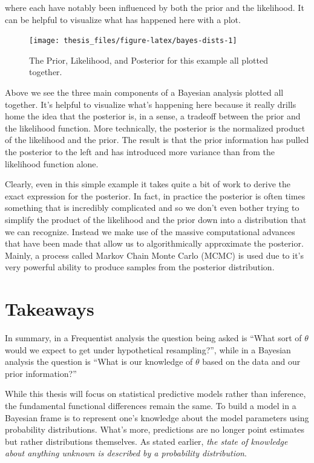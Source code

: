 \documentclass[12pt,twoside]{reedthesis}
\begin{document}
where each have notably been influenced by both the prior and the likelihood. It can be helpful to visualize what has happened here with a plot.
\begin{figure}

{\centering \texttt{[image: thesis\_files/figure-latex/bayes-dists-1]} 

}

\caption{The Prior, Likelihood, and Posterior for this example all plotted together.}\label{fig:bayes-dists}
\end{figure}
Above we see the three main components of a Bayesian analysis plotted all together. It's helpful to visualize what's happening here because it really drills home the idea that the posterior is, in a sense, a tradeoff between the prior and the likelihood function. More technically, the posterior is the normalized product of the likelihood and the prior. The result is that the prior information has pulled the posterior to the left and has introduced more variance than from the likelihood function alone.

Clearly, even in this simple example it takes quite a bit of work to derive the exact expression for the posterior. In fact, in practice the posterior is often times something that is incredibly complicated and so we don't even bother trying to simplify the product of the likelihood and the prior down into a distribution that we can recognize. Instead we make use of the massive computational advances that have been made that allow us to algorithmically approximate the posterior. Mainly, a process called Markov Chain Monte Carlo (MCMC) is used due to it's very powerful ability to produce samples from the posterior distribution.

\hypertarget{takeaways}{%
\section{Takeaways}\label{takeaways}}

In summary, in a Frequentist analysis the question being asked is ``What sort of \(\theta\) would we expect to get under hypothetical resampling?'', while in a Bayesian analysis the question is ``What is our knowledge of \(\theta\) based on the data and our prior information?''

While this thesis will focus on statistical predictive models rather than inference, the fundamental functional differences remain the same. To build a model in a Bayesian frame is to represent one's knowledge about the model parameters using probability distributions. What's more, predictions are no longer point estimates but rather distributions themselves. As stated earlier, \emph{the state of knowledge about anything unknown is described by a probability distribution}.
\end{document}
